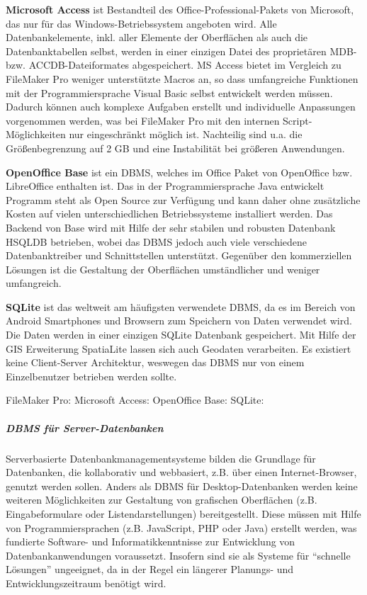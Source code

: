 {\bfseries Microsoft Access} ist Bestandteil des Office-Professional-Pakets von Microsoft, das nur für das Windows-Betriebssystem angeboten wird. Alle Datenbankelemente, inkl. aller Elemente der Oberflächen als auch die Datenbanktabellen selbst, werden in einer einzigen Datei des proprietären MDB- bzw. ACCDB-Dateiformates abgespeichert. MS Access bietet im Vergleich zu FileMaker Pro weniger unterstützte Macros an, so dass umfangreiche Funktionen mit der Programmiersprache Visual Basic selbst entwickelt werden müssen. Dadurch können auch komplexe Aufgaben erstellt und individuelle Anpassungen vorgenommen werden, was bei FileMaker Pro mit den internen Script-Möglichkeiten nur eingeschränkt möglich ist. Nachteilig sind u.a. die Größenbegrenzung auf 2 GB und eine Instabilität bei größeren Anwendungen.

{\bfseries OpenOffice Base} ist ein DBMS, welches im Office Paket von OpenOffice bzw. LibreOffice enthalten ist. Das in der Programmiersprache Java entwickelt Programm steht als Open Source zur Verfügung und kann daher ohne zusätzliche Kosten auf vielen unterschiedlichen Betriebssysteme installiert werden. Das Backend von Base wird mit Hilfe der sehr stabilen und robusten Datenbank HSQLDB betrieben, wobei das DBMS jedoch auch viele verschiedene Datenbanktreiber und Schnittstellen unterstützt. Gegenüber den kommerziellen Lösungen ist die Gestaltung der Oberflächen umständlicher und weniger umfangreich.

{\bfseries SQLite} ist das weltweit am häufigsten verwendete DBMS, da es im Bereich von Android Smartphones und Browsern zum Speichern von Daten verwendet wird. Die Daten werden in einer einzigen SQLite Datenbank gespeichert. Mit Hilfe der GIS Erweiterung SpatiaLite lassen sich auch Geodaten verarbeiten. Es existiert keine Client-Server Architektur, weswegen das DBMS nur von einem Einzelbenutzer betrieben werden sollte.

\begin{flushleft}
FileMaker Pro: 
Microsoft Access: 
OpenOffice Base: 
SQLite: 
\end{flushleft}


\subparagraph{DBMS für Server-Datenbanken}
Serverbasierte Datenbankmanagementsysteme bilden die Grundlage für Datenbanken, die kollaborativ und webbasiert, z.B. über einen Internet-Browser, genutzt werden sollen. Anders als DBMS für Desktop-Datenbanken werden keine weiteren Möglichkeiten zur Gestaltung von grafischen Oberflächen (z.B. Eingabeformulare oder Listendarstellungen) bereitgestellt. Diese müssen mit Hilfe von Programmiersprachen (z.B. JavaScript, PHP oder Java) erstellt werden, was fundierte Software- und Informatikkenntnisse zur Entwicklung von Datenbankanwendungen voraussetzt. Insofern sind sie als Systeme für "`schnelle Lösungen"' ungeeignet, da in der Regel ein längerer Planungs- und Entwicklungszeitraum benötigt wird. 

